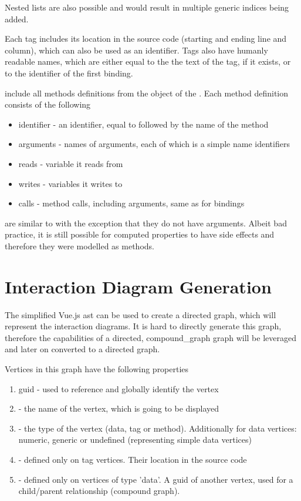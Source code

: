 Nested lists are also possible and would result in multiple generic indices being added.

Each tag includes its location in the source code (starting and ending line and column), which can also be used as an identifier. Tags also have humanly readable names, which are either equal to the the text of the tag, if it exists, or to the identifier of the first binding. 

 include all methods definitions from the  object of the . Each method definition consists of the following
\begin{itemize}
    \item identifier - an identifier, equal to  followed by the name of the method
    \item arguments - names of arguments, each of which is a simple name identifiers
    \item reads - variable it reads from
    \item writes - variables it writes to
    \item calls - method calls, including arguments, same as for bindings 
\end{itemize}

 are similar to  with the exception that they do not have arguments. Albeit bad practice, it is still possible for computed properties to have side effects and therefore they were modelled as methods.

\section{Interaction Diagram Generation}

The simplified Vue.js \gls{ast} can be used to create a directed graph, which will represent the interaction diagrams. It is hard to directly generate this graph, therefore the capabilities of a directed, \gls{compound_graph} graph will be leveraged and later on converted to a directed graph. 

Vertices in this graph have the following properties
\label{concept:interaction_diagram_structure}
\begin{enumerate}
    \item \gls{guid} - used to reference and globally identify the vertex 
    \item {} - the name of the vertex, which is going to be displayed
    \item {} - the type of the vertex (data, tag or method). Additionally for data vertices: numeric, generic or undefined (representing simple data vertices)
    \item {} - defined only on tag vertices. Their location in the source code
    \item {} - defined only on vertices of type 'data'. A \gls{guid} of another vertex, used for a child/parent relationship (compound graph).
\end{enumerate}

